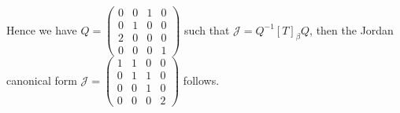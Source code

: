 \begin{Exercise}
\begin{enumerate}[(a)]
\begin{solution}
			Hence we have $Q = \begin{pmatrix}
			0 & 0 & 1 & 0 \\
			0 & 1 & 0 & 0 \\
			2 & 0 & 0 & 0 \\
			0 & 0 & 0 & 1
			\end{pmatrix}$ such that $\mathcal{J} = Q^{-1} [T]_{\beta} Q$, then the Jordan canonical form $\mathcal{J} = \begin{pmatrix}
			1 & 1 & 0 & 0 \\
			0 & 1 & 1 & 0 \\
			0 & 0 & 1 & 0 \\
			0 & 0 & 0 & 2
			\end{pmatrix}$ follows.
			
			
		\end{solution}
	\end{enumerate}
\end{Exercise}